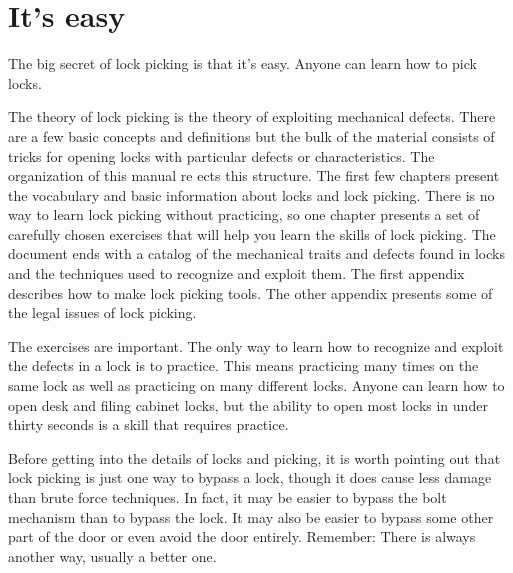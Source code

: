 \chapter{It's easy}
The big secret of lock picking is that it's easy. Anyone can learn how to pick locks.

The theory of lock picking is the theory of exploiting mechanical defects. There are a
few basic concepts and definitions but the bulk of the material consists of tricks for opening
locks with particular defects or characteristics. The organization of this manual re
ects this structure. The first few chapters present the vocabulary and basic information about locks
and lock picking. There is no way to learn lock picking without practicing, so one chapter
presents a set of carefully chosen exercises that will help you learn the skills of lock picking.
The document ends with a catalog of the mechanical traits and defects found in locks and
the techniques used to recognize and exploit them. The first appendix describes how to make
lock picking tools. The other appendix presents some of the legal issues of lock picking.

The exercises are important. The only way to learn how to recognize and exploit the
defects in a lock is to practice. This means practicing many times on the same lock as well
as practicing on many different locks. Anyone can learn how to open desk and filing cabinet
locks, but the ability to open most locks in under thirty seconds is a skill that requires
practice.

Before getting into the details of locks and picking, it is worth pointing out that lock
picking is just one way to bypass a lock, though it does cause less damage than brute force
techniques. In fact, it may be easier to bypass the bolt mechanism than to bypass the lock.
It may also be easier to bypass some other part of the door or even avoid the door entirely.
Remember: There is always another way, usually a better one.
